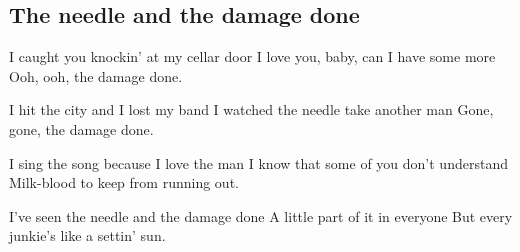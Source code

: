 \subsection*{The needle and the damage done   }
\begin{guitar}
I caught you knockin' at my cellar door
I love you, baby, can I have some more
Ooh, ooh, the damage done.


I hit the city and I lost my band
I watched the needle take another man
Gone, gone, the damage done.


I sing the song because I love the man
I know that some of you don't understand
Milk-blood to keep from running out.


I've seen the needle and the damage done
A little part of it in everyone
But every junkie's like a settin' sun.
\end{guitar}
